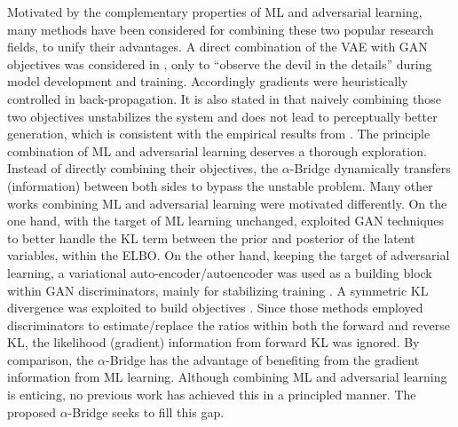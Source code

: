 \documentclass[letterpaper]{article} %
\begin{document}
Motivated by the complementary properties of ML and adversarial learning, many methods have been considered for combining these two popular research fields, to unify their advantages. 
A direct combination of the VAE with GAN objectives was considered in \cite{larsen2015autoencoding}, only to ``observe the devil in the details'' during model development and training. Accordingly gradients were heuristically controlled in back-propagation.
It is also stated in \cite{mathieu2016disentangling} that naively combining 
those two objectives unstabilizes the system and does not lead to perceptually better generation, which is consistent with the empirical results from \cite{zhang2019training}.
The principle combination of ML and adversarial learning deserves a thorough exploration.
Instead of directly combining their objectives, the $\alpha$-Bridge dynamically transfers (information) between both sides to bypass the unstable problem.
Many other works combining ML and adversarial learning were motivated differently. On the one hand, with the target of ML learning unchanged, \cite{makhzani2015adversarial,mescheder2017adversarial} exploited GAN techniques to better handle the KL term between the prior and posterior of the latent variables, within the ELBO. On the other hand, keeping the target of adversarial learning, a variational auto-encoder/autoencoder was used as a building block within GAN discriminators, mainly for stabilizing training
\cite{berthelot2017began,ulyanov2018takes}.
A symmetric KL divergence was exploited to build objectives \cite{pu2017adversarial,chen2018symmetric}. Since those methods employed discriminators to estimate/replace the ratios within both the forward and reverse KL, the likelihood (gradient) information from forward KL was ignored.
By comparison, the $\alpha$-Bridge has the advantage of benefiting from the gradient information from ML learning.
Although combining ML and adversarial learning is enticing, no previous work has achieved this in a principled manner. 
The proposed $\alpha$-Bridge seeks to fill this gap. 
\end{document}
